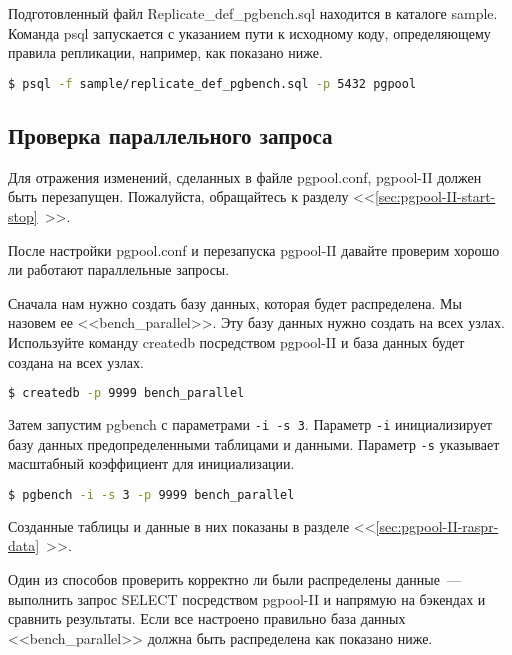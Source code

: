 Подготовленный файл Replicate\_def\_pgbench.sql находится в каталоге sample. Команда psql запускается с указанием пути к исходному коду, определяющему правила репликации, например, как показано ниже.

\begin{lstlisting}[language=Bash,label=lst:pgpool36,caption=Установка правил репликации]
$ psql -f sample/replicate_def_pgbench.sql -p 5432 pgpool
\end{lstlisting}

\subsection{Проверка параллельного запроса}

Для отражения изменений, сделанных в файле pgpool.conf, pgpool-II должен быть перезапущен. Пожалуйста, обращайтесь к разделу <<\ref{sec:pgpool-II-start-stop}~>>.

После настройки pgpool.conf и перезапуска pgpool-II давайте проверим хорошо ли работают параллельные запросы.

Сначала нам нужно создать базу данных, которая будет распределена. Мы назовем ее <<bench\_parallel>>. Эту базу данных нужно создать на всех узлах. Используйте команду createdb посредством pgpool-II и база данных будет создана на всех узлах.

\begin{lstlisting}[language=Bash,label=lst:pgpool37,caption=Проверка параллельного запроса]
$ createdb -p 9999 bench_parallel
\end{lstlisting}

Затем запустим pgbench с параметрами \lstinline!-i -s 3!. Параметр \lstinline!-i! инициализирует базу данных предопределенными таблицами и данными. Параметр \lstinline!-s! указывает масштабный коэффициент для инициализации.

\begin{lstlisting}[language=Bash,label=lst:pgpool38,caption=Проверка параллельного запроса]
$ pgbench -i -s 3 -p 9999 bench_parallel
\end{lstlisting}

Созданные таблицы и данные в них показаны в разделе <<\ref{sec:pgpool-II-raspr-data}~>>.

Один из способов проверить корректно ли были распределены данные~--- выполнить запрос SELECT посредством pgpool-II и напрямую на бэкендах и сравнить результаты. Если все настроено правильно база данных <<bench\_parallel>> должна быть распределена как показано ниже.

